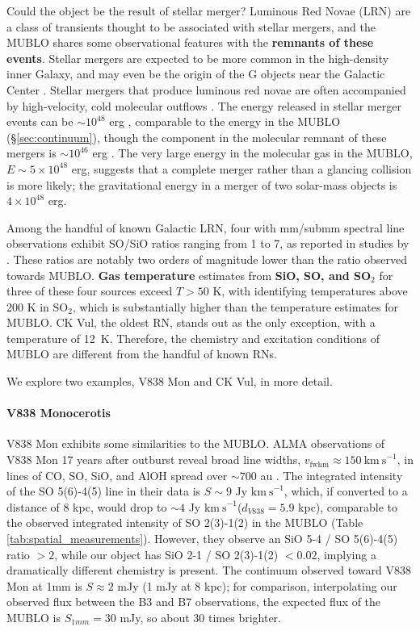 \documentclass[]{aastex631}
\newcommand{\kms}{\ensuremath{\mathrm{km~s}^{-1}}\xspace}
\def\rr#1{\textbf{#1}}
\begin{document}
Could the object be the result of stellar merger?
Luminous Red Novae (LRN) are a class of transients thought to be associated with stellar mergers, and the MUBLO shares some observational features with the \rr{remnants of these events}.
Stellar mergers are expected to be more common in the high-density inner Galaxy, and may even be the origin of the G objects near the Galactic Center \citep{Ciurlo2020}.
Stellar mergers that produce luminous red novae are often accompanied by high-velocity, cold molecular outflows \citep{Kaminski2018}.
The energy released in stellar merger events can be $\sim10^{48}$ erg \citep{Retter2006}, comparable to the energy in the MUBLO (\S \ref{sec:continuum}), though the component in the molecular remnant of these mergers is $\sim10^{46}$ erg \citep[][]{Kaminski2018}.
The very large energy in the molecular gas in the MUBLO, $E\sim5\times10^{48}$ erg, suggests that a complete merger rather than a glancing collision is more likely; the gravitational energy in a merger of two solar-mass objects is $4\times10^{48}$ erg.

Among the handful of known Galactic LRN, four with mm/submm spectral line observations exhibit SO/SiO ratios ranging from 1 to 7, as reported in studies by \citet{Kaminski2015,Kaminski2018,Kaminski2020}.
These ratios are notably two orders of magnitude lower than the ratio observed towards MUBLO.
\rr{Gas temperature} estimates from \rr{SiO, SO, and SO$_2$} for three of these four sources exceed $T>50$ K, with \citet{Kaminski2018} identifying temperatures above 200 K in SO$_2$, which is substantially higher than the temperature estimates for MUBLO.
CK Vul, the oldest RN, stands out as the only exception, with a temperature of 12~K.
Therefore, the chemistry and excitation conditions of MUBLO are  different from the handful of known RNs.

We explore two examples, V838 Mon and CK Vul, in more detail.

\paragraph{V838 Monocerotis}
V838 Mon exhibits some similarities to the MUBLO.
ALMA observations of V838 Mon 17 years after outburst reveal broad line widths, $v_{\mathrm{fwhm}} \approx 150~\kms$, in lines of CO, SO, SiO, and AlOH spread over $\sim 700$ au \citep{Kaminski2021}.
The integrated intensity of the SO 5(6)-4(5) line in their data is $S\sim9$ Jy \kms, which, if converted to a distance of 8 kpc, would drop to $\sim4$ Jy \kms ($d_{V838}=5.9$ kpc), comparable to the observed integrated intensity of SO 2(3)-1(2) in the MUBLO (Table \ref{tab:spatial_measurements}).
However, they observe an SiO 5-4 / SO 5(6)-4(5) ratio $>2$, while our object has SiO 2-1 / SO 2(3)-1(2) $<0.02$, implying a dramatically different chemistry is present.
The continuum observed toward V838 Mon at 1mm is $S\approx2$ mJy (1 mJy at 8 kpc); for comparison, interpolating our observed flux between the B3 and B7 observations, the expected flux of the MUBLO is $S_{1mm}=30$ mJy, so about 30 times brighter.
\end{document}
